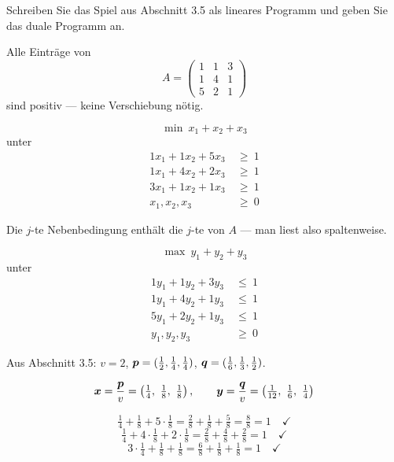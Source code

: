 \begin{aufgabe}
Schreiben Sie das Spiel aus Abschnitt 3.5 als lineares Programm und geben Sie das duale Programm an.

\loesung
{}
Alle Einträge von
\[ A = \begin{pmatrix} 1 & 1 & 3\\ 1 & 4 & 1\\ 5 & 2 & 1 \end{pmatrix} \]
sind positiv --- keine Verschiebung nötig.

\[ \min\ x_1+x_2+x_3 \]
unter
\begin{align*}
1x_1 + 1x_2 + 5x_3 &\ \ge\ 1\\
1x_1 + 4x_2 + 2x_3 &\ \ge\ 1\\
3x_1 + 1x_2 + 1x_3 &\ \ge\ 1\\
x_1,x_2,x_3 &\ \ge\ 0
\end{align*}

 Die $j$-te Nebenbedingung enthält die $j$-te  von $A$ --- man liest also spaltenweise.

\[ \max\ y_1+y_2+y_3 \]
unter
\begin{align*}
1y_1 + 1y_2 + 3y_3 &\ \le\ 1\\
1y_1 + 4y_2 + 1y_3 &\ \le\ 1\\
5y_1 + 2y_2 + 1y_3 &\ \le\ 1\\
y_1,y_2,y_3 &\ \ge\ 0
\end{align*}


Aus Abschnitt 3.5: $v = 2$, $\boldsymbol{p} = (\tfrac12,\tfrac14,\tfrac14)$, $\boldsymbol{q} = (\tfrac16,\tfrac13,\tfrac12)$.

\[ \boldsymbol{x} = \frac{\boldsymbol{p}}{v} = \left(\tfrac14,\ \tfrac18,\ \tfrac18\right), \qquad \boldsymbol{y} = \frac{\boldsymbol{q}}{v} = \left(\tfrac1{12},\ \tfrac16,\ \tfrac14\right) \]

\[ \tfrac14 + \tfrac18 + 5\cdot\tfrac18 = \tfrac{2}{8}+\tfrac18+\tfrac58 = \tfrac88 = 1 \quad \checkmark \]
\[ \tfrac14 + 4\cdot\tfrac18 + 2\cdot\tfrac18 = \tfrac28+\tfrac48+\tfrac28 = 1 \quad \checkmark \]
\[ 3\cdot\tfrac14 + \tfrac18 + \tfrac18 = \tfrac68+\tfrac18+\tfrac18 = 1 \quad \checkmark \]


\end{aufgabe}
